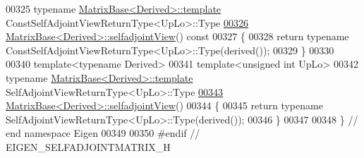 \begin{DoxyCode}
00325 \textcolor{keyword}{typename} \hyperlink{group___core___module_class_eigen_1_1_matrix_base}{MatrixBase<Derived>::template} 
      ConstSelfAdjointViewReturnType<UpLo>::Type
\hyperlink{group___core___module_ac704555d9f57663a136f73ae285f1cd0}{00326} \hyperlink{group___core___module_class_eigen_1_1_matrix_base}{MatrixBase<Derived>::selfadjointView}()\textcolor{keyword}{ const}
00327 \textcolor{keyword}{}\{
00328   \textcolor{keywordflow}{return} \textcolor{keyword}{typename} ConstSelfAdjointViewReturnType<UpLo>::Type(derived());
00329 \}
00330 
00340 \textcolor{keyword}{template}<\textcolor{keyword}{typename} Derived>
00341 \textcolor{keyword}{template}<\textcolor{keywordtype}{unsigned} \textcolor{keywordtype}{int} UpLo>
00342 \textcolor{keyword}{typename} \hyperlink{group___core___module_class_eigen_1_1_matrix_base}{MatrixBase<Derived>::template} SelfAdjointViewReturnType<UpLo>::Type
\hyperlink{group___core___module_a5eaa235a14802c9419cac5805549adea}{00343} \hyperlink{group___core___module_class_eigen_1_1_matrix_base}{MatrixBase<Derived>::selfadjointView}()
00344 \{
00345   \textcolor{keywordflow}{return} \textcolor{keyword}{typename} SelfAdjointViewReturnType<UpLo>::Type(derived());
00346 \}
00347 
00348 \} \textcolor{comment}{// end namespace Eigen}
00349 
00350 \textcolor{preprocessor}{#endif // EIGEN\_SELFADJOINTMATRIX\_H}
\end{DoxyCode}
